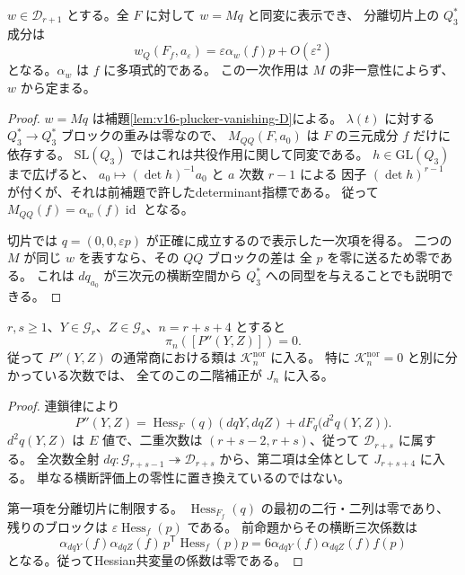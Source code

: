 \begin{proposition}[Pfaffian方向の正確な横断一次項]
\label{prop:v17-scalar-normal-pfaffian-action}
$w\in\mathcal D_{r+1}$ とする。全 $F$ に対して
$w=Mq$ と同変に表示でき、
分離切片上の $Q_3^*$ 成分は
\begin{equation}\label{eq:v17-scalar-normal-pfaffian-action}
 w_Q(F_f,a_\varepsilon)
  =\varepsilon\alpha_w(f)p+O(\varepsilon^2)
\end{equation}
となる。$\alpha_w$ は $f$ に多項式的である。
この一次作用は $M$ の非一意性によらず、$w$ から定まる。
\end{proposition}

\begin{proof}
$w=Mq$ は補題\ref{lem:v16-plucker-vanishing-D}による。
$\lambda(t)$ に対する $Q_3^*\to Q_3^*$ ブロックの重みは零なので、
$M_{QQ}(F,a_0)$ は $F$ の三元成分 $f$ だけに依存する。
$\mathrm{SL}(Q_3)$ ではこれは共役作用に関して同変である。
$h\in\mathrm{GL}(Q_3)$ まで広げると、
$a_0\mapsto(\det h)^{-1}a_0$ と $a$ 次数 $r-1$ による
因子 $(\det h)^{r-1}$ が付くが、それは前補題で許したdeterminant指標である。
従って $M_{QQ}(f)=\alpha_w(f)\operatorname{id}$ となる。

切片では $q=(0,0,\varepsilon p)$ が正確に成立するので表示した一次項を得る。
二つの $M$ が同じ $w$ を表すなら、その $QQ$ ブロックの差は
全 $p$ を零に送るため零である。
これは $dq_{a_0}$ が三次元の横断空間から $Q_3^*$ への同型を与えることでも説明できる。
\end{proof}

\begin{theorem}[全二階接触補正は横断射影で消える]
\label{thm:v17-quadratic-actions-normal-zero}
$r,s\ge1$、$Y\in\mathcal G_r$、$Z\in\mathcal G_s$、$n=r+s+4$ とすると
\begin{equation}\label{eq:v17-quadratic-actions-normal-zero}
 \pi_n([P''(Y,Z)])=0.
\end{equation}
従って $P''(Y,Z)$ の通常商における類は
$\mathcal K_n^{\mathrm{nor}}$ に入る。
特に $\mathcal K_n^{\mathrm{nor}}=0$ と別に分かっている次数では、
全てのこの二階補正が $J_n$ に入る。
\end{theorem}

\begin{proof}
連鎖律により
\[
 P''(Y,Z)=\operatorname{Hess}_F(q)(dqY,dqZ)
              +dF_q\bigl(d^2q(Y,Z)\bigr).
\]
$d^2q(Y,Z)$ は $E$ 値で、二重次数は
$(r+s-2,r+s)$、従って $\mathcal D_{r+s}$ に属する。
全次数全射 $dq:\mathcal G_{r+s-1}\twoheadrightarrow\mathcal D_{r+s}$
から、第二項は全体として $J_{r+s+4}$ に入る。
単なる横断評価上の零性に置き換えているのではない。

第一項を分離切片に制限する。
$\operatorname{Hess}_{F_f}(q)$ の最初の二行・二列は零であり、
残りのブロックは $\varepsilon\operatorname{Hess}_f(p)$ である。
前命題からその横断三次係数は
\[
 \alpha_{dqY}(f)\alpha_{dqZ}(f)\,
       p^{\mathsf T}\operatorname{Hess}_f(p)p
 =6\alpha_{dqY}(f)\alpha_{dqZ}(f)f(p)
\]
となる。従ってHessian共変量の係数は零である。
\end{proof}

